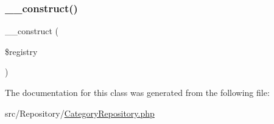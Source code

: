 \subsubsection{\texorpdfstring{\+\_\+\+\_\+construct()}{\_\_construct()}}
{\footnotesize\ttfamily \+\_\+\+\_\+construct (\begin{DoxyParamCaption}\item[{Manager\+Registry}]{\$registry }\end{DoxyParamCaption})}



The documentation for this class was generated from the following file\+:\begin{DoxyCompactItemize}
\item 
src/\+Repository/\mbox{\hyperlink{_category_repository_8php}{Category\+Repository.\+php}}\end{DoxyCompactItemize}
